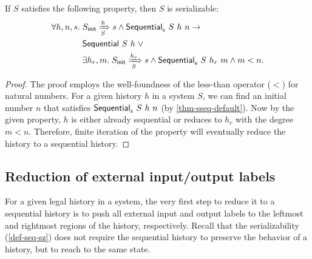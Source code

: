 \begin{theorem}
  \label{thm-sseq-sz}
  If $S$ satisfies the following property, then $S$ is serializable:
  \begin{align*}
    \forall h, n, s.\; & S_{\textsf{init}} \xRightarrow[S]{h} s \land \mathsf{Sequential}_{\textrm{s}}\ S\ h\ n \to \\
    & \mathsf{Sequential}\ S\ h\; \vee\\
    & \exists h_r, m.\; S_{\textsf{init}} \xRightarrow[S]{h_r} s \wedge \mathsf{Sequential}_{\textrm{s}}\ S\ h_r\ m \wedge m < n.
  \end{align*}
\end{theorem}
\begin{proof}
  The proof employs the well-foundness of the less-than operator ($<$) for natural numbers.
  For a given history $h$ in a system $S$, we can find an initial number $n$ that satisfies $\mathsf{Sequential}_{\textrm{s}}\ S\ h\ n$ (by \autoref{thm-sseq-default}).
  Now by the given property, $h$ is either already sequential or reduces to $h_r$ with the degree $m < n$.
  Therefore, finite iteration of the property will eventually reduce the history to a sequential history.
\end{proof}

\subsection{Reduction of external input/output labels}
\label{sec-red-ext-labels}

For a given legal history in a system, the very first step to reduce it to a sequential history is to push all external input and output labels to the leftmost and rightmost regions of the history, respectively.
Recall that the serializability (\autoref{def-seq-sz}) does not require the sequential history to preserve the behavior of a history, but to reach to the same state.

